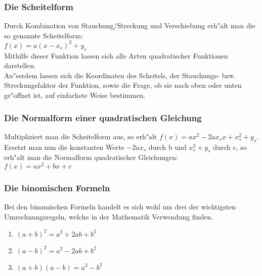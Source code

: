 \subsubsection{Die Scheitelform}
Durch Kombination von Stauchung/Streckung und Verschiebung erh"alt man die so genannte Scheitelform:\\
$f(x)=a(x-x_s)^2+y_s$\\
Mithilfe dieser Funktion lassen sich alle Arten quadratischer Funktionen darstellen.\\
Au"serdem lassen sich die Koordinaten des Scheitels, der Stauchungs- bzw. Streckungsfaktor der Funktion, sowie die Frage, ob sie nach oben oder unten ge"offnet ist, auf einfachste Weise bestimmen.

\subsubsection{Die Normalform einer quadratischen Gleichung}
Multipliziert man die Scheitelform aus, so erh"alt $f(x)=ax^2-2ax_sx+x_s^2+y_s$.\\
Ersetzt man nun die konstanten Werte $-2ax_s$ durch b und $x_s^2+y_s$ durch c, so erh"alt man die Normalform quadratischer Gleichungen:\\
$f(x)=ax^2+bx+c$

\subsubsection{Die binomischen Formeln}
Bei den binomischen Formeln handelt es sich wohl um drei der wichtigsten Umrechnungsregeln, welche in der Mathematik Verwendung finden.\\
\begin{enumerate}
\item $(a+b)^2=a^2+2ab+b^2$
\item $(a-b)^2=a^2-2ab+b^2$
\item $(a+b)(a-b)=a^2-b^2$
\end{enumerate}

